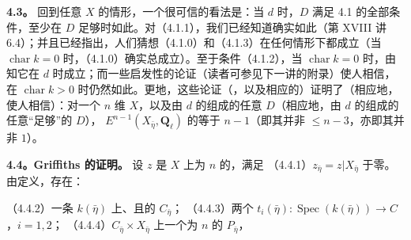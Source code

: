 \textbf{4.3。} 回到任意 $X$ 的情形，一个很可信的看法是：当 $d$ 时，$D$ 满足 4.1 的全部条件，至少在 $D$ 足够时如此。对（4.1.1），我们已经知道确实如此（第 XVIII 讲 6.4）；并且已经指出，人们猜想（4.1.0）和（4.1.3）在任何情形下都成立（当 $\operatorname{char}k=0$ 时，（4.1.0）确实总成立）。至于条件（4.1.2），当 $\operatorname{char}k=0$ 时，由 知它在 $d$ 时成立；而一些启发性的论证（读者可参见下一讲的附录）使人相信，在 $\operatorname{char}k>0$ 时仍然如此。更地，这些论证（，以及相应的）证明了（相应地，使人相信）：对一个 $n$ 维 $X$，以及由 $d$ 的组成的任意 $D$（相应地，由 $d$ 的组成的任意“足够”的 $D$）， $E^{n-1}(X_{\bar\eta},\mathbf Q_\ell)$ 的等于 $n-1$（即其并非 $\leq n-3$，亦即其并非 $1$）。

\textbf{4.4。Griffiths 的证明。}
设 $z$ 是 $X$ 上为 $n$ 的，满足
\noindent（4.4.1）$z_{\bar\eta}=z|X_{\bar\eta}$ 于零。
由定义，存在：

\noindent（4.4.2）一条 $k(\bar\eta)$ 上、且的 $C_{\bar\eta}$；
\noindent（4.4.3）两个 $t_i(\bar\eta):\operatorname{Spec}(k(\bar\eta))\longrightarrow C$，$i=1,2$；
\noindent（4.4.4）$C_{\bar\eta}\times X_{\bar\eta}$ 上一个为 $n$ 的 $P_{\bar\eta}$，

